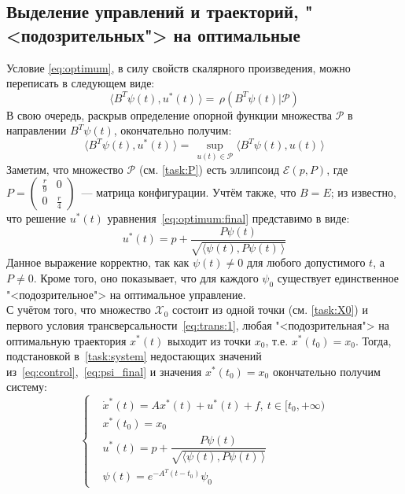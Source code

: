 \documentclass[11pt, oneside, final]{article}
\theoremstyle{break}
\numberwithin{equation}{section}
\theoremstyle{plain}
\theoremstyle{definition}
\newcommand{\scalar}[2]{\langle #1, #2\,\rangle}
\begin{document}
    \subsection{Выделение управлений и траекторий, "<подозрительных"> на оптимальные} %
    \label{sub:pseudo_optimum}
    Условие \eqref{eq:optimum}, в силу свойств скалярного произведения, можно переписать в следующем виде:
    \begin{equation*}
        \scalar{B^{T}\psi(t)}{u^{*}(t)} = \, \rho(B^{T}\psi(t)|\mathcal{P}) \label{eq:optimum2}  
    \end{equation*}
    В свою очередь, раскрыв определение опорной функции множества \(\mathcal{P}\) в направлении \(B^{T}\psi(t)\), окончательно получим:
    \begin{equation}
        \label{eq:optimum:final}
        \scalar{B^{T}\psi(t)}{u^{*}(t)} = \, \sup_{u(t)\in\mathcal{P}}\scalar{B^{T}\psi(t)}{u(t)}
    \end{equation}
    Заметим, что множество \(\mathcal{P}\) (см. \eqref{task:P}) есть эллипсоид \( \mathcal{E}(p, P)\), где \(P = 
    \left(\begin{smallmatrix} \frac{r}{9} & 0 \\ 0 & \frac{r}{4} \end{smallmatrix}\right)\)~--- матрица конфигурации.
    Учтём также, что \(B = E\); из \cite{Roublev:optimal:linear} известно, что решение \(u^{*}(t)\) уравнения~\eqref{eq:optimum:final} представимо в виде:
    \begin{equation}
    \label{eq:control}
        u^{*}(t) = p + \dfrac{P\psi(t)}{\sqrt{\scalar{\psi(t)}{P\psi(t)}}}
    \end{equation}
    Данное выражение корректно, так как \(\psi(t) \neq 0\) для любого допустимого \(t\), а \(P \neq 0\). Кроме того, оно показывает, что для каждого \(\psi_0\) существует единственное "<подозрительное"> на оптимальное управление. \\
    С учётом того, что множество \(\mathcal{X}_0\) состоит из одной точки (см. \eqref{task:X0}) и первого условия трансверсальности~\eqref{eq:trans:1}, любая "<подозрительная"> на оптимальную траектория \(x^{*}(t)\) выходит из точки \(x_0\), т.е. \(x^{*}(t_0) = x_0\). Тогда, подстановкой в~\eqref{task:system} недостающих значений из~\eqref{eq:control},~\eqref{eq:psi_final} и значения \(x^{*}(t_0) = x_0\) окончательно получим систему:
    \begin{equation}
        \label{eq:system_final}
        \left\{
        \begin{aligned}
            & \dot x^{*}(t) = Ax^{*}(t) + u^{*}(t) + f,\:t \in [t_0, +\infty) \\
            & x^{*}(t_0) = x_0 \\
            & u^{*}(t) = p + \dfrac{P\psi(t)}{\sqrt{\scalar{\psi(t)}{P\psi(t)}}} \\
            & \psi(t) = e^{-A^{T}(t - t_0)}\psi_0
        \end{aligned}
        \right.
    \end{equation}
\end{document}
